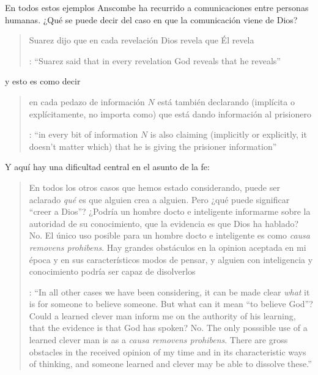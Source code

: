 En todos estos ejemplos Anscombe ha recurrido a comunicaciones entre personas humanas. ¿Qué se puede decir del caso en que la comunicación viene de Dios? \blockquote[{\cite[118]{anscombe1981erp:faith}}: \enquote{Suarez said that in every revelation God reveals that he reveals}]{Suarez dijo que en cada revelación Dios revela que Él revela} y esto es como decir \blockquote[{\cite[118]{anscombe1981erp:faith}}: \enquote{in every bit of information $N$ is also claiming (implicitly or explicitly, it doesn't matter which) that he is giving the prisioner information}]{en cada pedazo de información $N$ está también declarando (implícita o explícitamente, no importa como) que está dando información al prisionero}. Y aquí hay una dificultad central en el asunto de la fe: \blockquote[{\cite[118]{anscombe1981erp:faith}}: \enquote{In all other cases we have been considering, it can be made clear \emph{what} it is for someone to believe someone. But what can it mean ``to believe God''? Could a learned clever man inform me on the authority of his learning, that the evidence is that God has spoken? No. The only posssible use of a learned clever man is as a \emph{causa removens prohibens}. There are gross obstacles in the received opinion of my time and in its characteristic ways of thinking, and someone learned and clever may be able to dissolve these.}]{En todos los otros casos que hemos estado considerando, puede ser aclarado \emph{qué} es que alguien crea a alguien. Pero ¿qué puede significar ``creer a Dios''? ¿Podría un hombre docto e inteligente informarme sobre la autoridad de su conocimiento, que la evidencia es que Dios ha hablado? No. El único uso posible para un hombre docto e inteligente es como \emph{causa removens prohibens}. Hay grandes obstáculos en la opinion aceptada en mi época y en sus característicos modos de pensar, y alguien con inteligencia y conocimiento podría ser capaz de disolverlos}.

